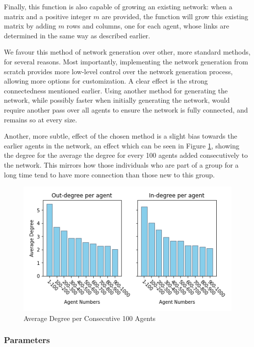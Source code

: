 \documentclass[a4paper, 12pt]{report}
\begin{document}
\noindent Finally, this function is also capable of growing an existing network: when a matrix and a positive integer $m$ are provided, the function will grow this existing matrix by adding $m$ rows and columns, one for each agent, whose links are determined in the same way as described earlier.

\noindent We favour this method of network generation over other, more standard methods, for several reasons. Most importantly, implementing the network generation from scratch provides more low-level control over the network generation process, allowing more options for customization. A clear effect is the strong connectedness mentioned earlier. Using another method for generating the network, while possibly faster when initially generating the network, would require another pass over all agents to ensure the network is fully connected, and remains so at every size. 

\noindent Another, more subtle, effect of the chosen method is a slight bias towards the earlier agents in the network, an effect which can be seen in Figure \ref{degree:agent}, showing the degree for the average the degree for every 100 agents added consecutively to the network. This mirrors how those individuals who are part of a group for a long time tend to have more connection than those new to this group.

\begin{center}
    \begin{figure}[!htbp]
        \centering
        \includegraphics[width=.8\textwidth]{ThesisKI/Images/DirectedStandardPerAgent_cropped.png}
        \caption{Average Degree per Consecutive 100 Agents}
        \label{degree:agent}
    \end{figure}
\end{center}


\subsubsection{Parameters}
\end{document}

